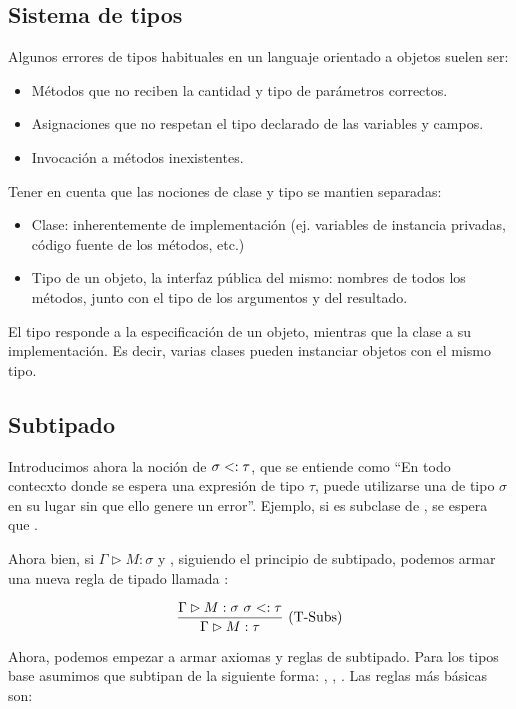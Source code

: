 
\subsection{Sistema de tipos}

Algunos errores de tipos habituales en un languaje orientado a objetos suelen ser:
\begin{itemize}
  \item Métodos que no reciben la cantidad y tipo de parámetros correctos.
  \item Asignaciones que no respetan el tipo declarado de las variables y campos.
  \item Invocación a métodos inexistentes.
\end{itemize}

Tener en cuenta que las nociones de clase y tipo se mantien separadas:
\begin{itemize}
  \item Clase: inherentemente de implementación (ej. variables de instancia privadas, código fuente de los métodos, etc.)
  \item Tipo de un objeto, la interfaz pública del mismo: nombres de todos los métodos, junto con el tipo de los argumentos y del resultado.
\end{itemize}

El tipo responde a la especificación de un objeto, mientras que la clase a su implementación. Es decir, varias clases pueden instanciar objetos con el mismo tipo.

\subsection{Subtipado}

Introducimos ahora la noción de  $\sigma <: \tau$, que se entiende como ``En todo contecxto donde se espera una expresión de tipo $\tau$, puede utilizarse una de tipo $\sigma$ en su lugar sin que ello genere un error''. Ejemplo, si  es subclase de , se espera que .

Ahora bien, si $\Gamma \rhd M : \sigma$ y \subt{\sigma}{\tau}, siguiendo el principio de subtipado, podemos armar una nueva regla de tipado llamada :

\[\deriv{\Gamma \rhd M : \sigma\ \subt{\sigma}{\tau}}{\Gamma \rhd M : \tau}{T-Subs}\]

Ahora, podemos empezar a armar axiomas y reglas de subtipado. Para los tipos base asumimos que subtipan de la siguiente forma: , , . Las reglas más básicas son:

